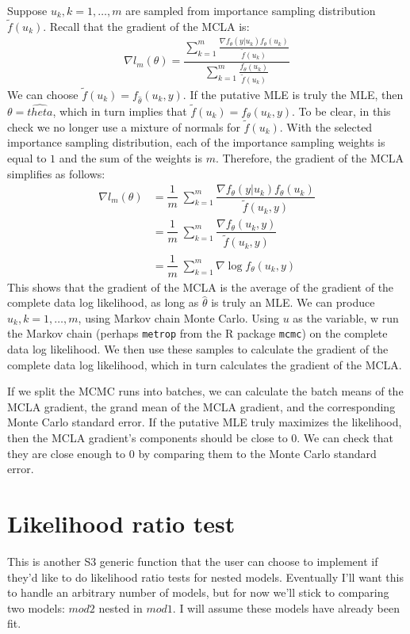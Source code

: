 \documentclass{article}
\begin{document}
Suppose $u_k,k=1,\ldots,m$ are sampled from importance sampling distribution $\tilde{f} (u_k)$. Recall that the gradient of the MCLA is:
\begin{align}
\nabla l_{m}(\theta) = \dfrac{\sum_{k=1}^m\frac{\nabla f_\theta(y|u_k) f_\theta(u_k)   }{\tilde{f}(u_k)}}{\sum_{k=1}^m \frac{  f_\theta(u_k)   }{\tilde{f}(u_k)}}
\end{align}
We can choose $\tilde{f}(u_k)=f_{\hat{\theta}}(u_k,y)$. If the putative MLE is truly the MLE, then $\theta=\hat{theta}$, which in turn implies that $\tilde{f}(u_k)=f_{{\theta}}(u_k,y)$.   To be clear, in this check  we no longer use a mixture of normals for $\tilde{f}(u_k)$.  With the selected importance sampling distribution, each of the importance sampling weights is equal to $1$ and the sum of the weights is $m$.  Therefore, the gradient of the MCLA simplifies as follows:
\begin{align}
\nabla l_{m}(\theta) &=\dfrac{1}{m} \; {\sum_{k=1}^m\dfrac{\nabla f_\theta(y|u_k) f_\theta(u_k)   }{\tilde{f}(u_k,y)}}\\
&= \dfrac{1}{m} \; {\sum_{k=1}^m\dfrac{\nabla f_\theta(u_k,y)   }{\tilde{f}(u_k,y)}} \\
&= \dfrac{1}{m} \; \sum_{k=1}^m \nabla \log f_\theta(u_k,y)
\end{align}
This shows that the gradient of the MCLA is the average of the gradient of the complete data log likelihood, as long as $\hat{\theta}$ is truly an MLE. We can produce $u_k,k=1,\ldots,m$, using Markov chain Monte Carlo. Using $u$ as the variable, w run the Markov chain (perhaps \texttt{metrop} from the R package \texttt{mcmc}) on the complete data log likelihood.  We then use these samples to calculate the gradient of the complete data log likelihood, which in turn calculates the gradient of the MCLA. 

 If we split the MCMC runs into batches, we can calculate the batch means of the MCLA gradient, the grand mean of the MCLA gradient, and the corresponding Monte Carlo standard error.  If the putative MLE truly maximizes the likelihood, then the MCLA gradient's components should be close to $0$. We can check that they are close enough to $0$ by comparing them to the Monte Carlo standard error.


\section{Likelihood ratio test}
This is another S3 generic function that the user can choose to implement if they'd  like  to do likelihood ratio tests for nested models. Eventually I'll want this to handle an arbitrary number of models, but for now we'll stick to comparing two models: $mod2$ nested in $mod1$.  I will assume these models have already been fit. 
\end{document}
